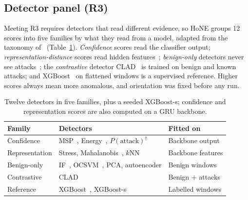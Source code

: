 \documentclass[conference]{IEEEtran}
\begin{document}
\subsection{Detector panel (R3)}
Meeting R3 requires detectors that read different evidence, so HoNE groups 12 scores into five families by what they read from a model, adapted from the taxonomy of~\cite{yang2024ood} (Table~\ref{tab:det}). \emph{Confidence} scores read the classifier output; \emph{representation-distance} scores read hidden features~\cite{lee2018,sun2022knn}; \emph{benign-only} detectors never see attacks~\cite{liu2008,scholkopf2001}; the \emph{contrastive} detector CLAD~\cite{wilkie2026} is trained on benign and known attacks; and XGBoost~\cite{chen2016} on flattened windows is a supervised reference. Higher scores always mean more anomalous, and orientation was fixed before any run.

\begin{table}[!t]
\centering\scriptsize\setlength{\tabcolsep}{2.5pt}
\caption{Twelve detectors in five families, plus a seeded XGBoost-s; confidence and representation scores are also computed on a GRU backbone.}
\label{tab:det}
\begin{tabular}{lll}
\toprule
Family & Detectors & Fitted on\\
\midrule
Confidence & MSP~\cite{hendrycks2017}, Energy~\cite{liu2020energy}, $P(\text{attack})^\dagger$ & Backbone output\\
Representation & Stress, Mahalanobis~\cite{lee2018}, $k$NN~\cite{sun2022knn} & Backbone features\\
Benign-only & IF~\cite{liu2008}, OCSVM~\cite{scholkopf2001}, PCA, autoencoder & Benign windows\\
Contrastive & CLAD~\cite{wilkie2026} & Benign + attacks\\
Reference & XGBoost~\cite{chen2016}, XGBoost-s & Labelled windows\\
\bottomrule
\end{tabular}
\end{table}
\end{document}
